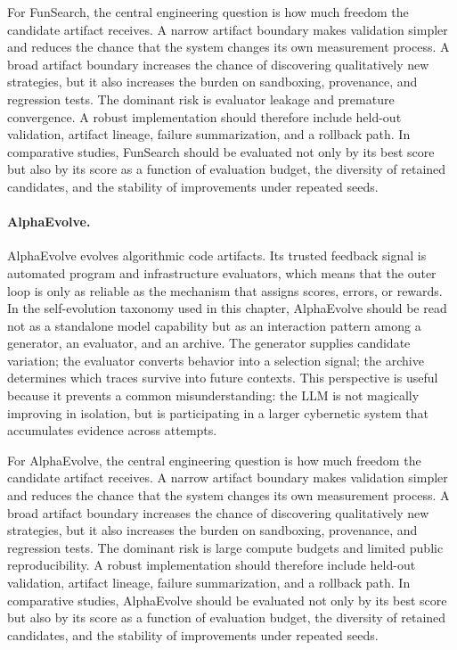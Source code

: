 For FunSearch, the central engineering question is how much freedom the candidate artifact receives.  A narrow artifact boundary makes validation simpler and reduces the chance that the system changes its own measurement process.  A broad artifact boundary increases the chance of discovering qualitatively new strategies, but it also increases the burden on sandboxing, provenance, and regression tests.  The dominant risk is evaluator leakage and premature convergence.  A robust implementation should therefore include held-out validation, artifact lineage, failure summarization, and a rollback path.  In comparative studies, FunSearch should be evaluated not only by its best score but also by its score as a function of evaluation budget, the diversity of retained candidates, and the stability of improvements under repeated seeds.

\paragraph{AlphaEvolve.} AlphaEvolve evolves algorithmic code artifacts.  Its trusted feedback signal is automated program and infrastructure evaluators, which means that the outer loop is only as reliable as the mechanism that assigns scores, errors, or rewards.  In the self-evolution taxonomy used in this chapter, AlphaEvolve should be read not as a standalone model capability but as an interaction pattern among a generator, an evaluator, and an archive.  The generator supplies candidate variation; the evaluator converts behavior into a selection signal; the archive determines which traces survive into future contexts.  This perspective is useful because it prevents a common misunderstanding: the LLM is not magically improving in isolation, but is participating in a larger cybernetic system that accumulates evidence across attempts.

For AlphaEvolve, the central engineering question is how much freedom the candidate artifact receives.  A narrow artifact boundary makes validation simpler and reduces the chance that the system changes its own measurement process.  A broad artifact boundary increases the chance of discovering qualitatively new strategies, but it also increases the burden on sandboxing, provenance, and regression tests.  The dominant risk is large compute budgets and limited public reproducibility.  A robust implementation should therefore include held-out validation, artifact lineage, failure summarization, and a rollback path.  In comparative studies, AlphaEvolve should be evaluated not only by its best score but also by its score as a function of evaluation budget, the diversity of retained candidates, and the stability of improvements under repeated seeds.

